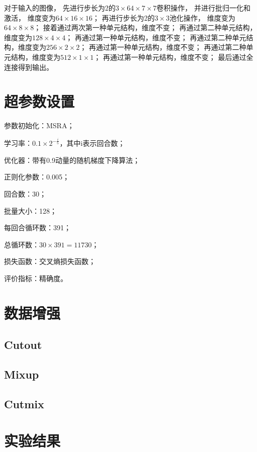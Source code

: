 \documentclass{article}
\begin{document}
对于输入的图像，
先进行步长为2的$3\times64\times7\times7$卷积操作，
并进行批归一化和激活，
维度变为$64\times16\times16$；
再进行步长为2的$3\times3$池化操作，
维度变为$64\times8\times8$；
接着通过两次第一种单元结构，维度不变；
再通过第二种单元结构，维度变为$128\times4\times4$；
再通过第一种单元结构，维度不变；
再通过第二种单元结构，维度变为$256\times2\times2$；
再通过第一种单元结构，维度不变；
再通过第二种单元结构，维度变为$512\times1\times1$；
再通过第一种单元结构，维度不变；
最后通过全连接得到输出。

\section{超参数设置}

参数初始化：MSRA；

学习率：$ 0.1 \times 2^{-\frac{i}{5}} $，其中i表示回合数；

优化器：带有0.9动量的随机梯度下降算法；

正则化参数：0.005；

回合数：30；

批量大小：128；

每回合循环数：391；

总循环数：$ 30 \times 391 = 11730 $；

损失函数：交叉熵损失函数；

评价指标：精确度。

\section{数据增强}

\subsection{Cutout}

\subsection{Mixup}

\subsection{Cutmix}

\section{实验结果}
\end{document}
